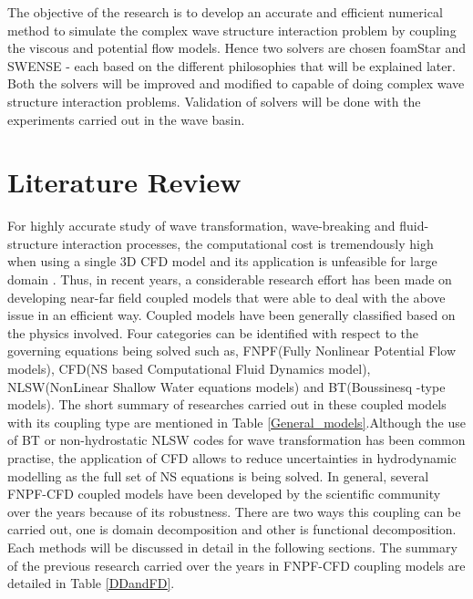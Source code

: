 \documentclass[preprint,12pt]{article}
\begin{document}
{The objective of the research is to develop an accurate and efficient numerical method to simulate the complex wave structure interaction problem by coupling the viscous and potential flow models. Hence two solvers are chosen foamStar and SWENSE - each based on the different philosophies that will be  explained later. Both the solvers will be improved and modified to capable of doing complex wave structure interaction problems. Validation of solvers will be done with the experiments carried out in the wave basin. 



\section{Literature Review}
For highly accurate study of wave transformation, wave-breaking and fluid-structure interaction processes, the computational cost is tremendously high when using a single 3D CFD model and its application is unfeasible for large domain \cite{Vandebeek2018}. Thus, in recent years, a considerable research effort has been made on developing near-far field coupled models that were able to deal with the above issue in an efficient way.  Coupled models have been generally classified based on the physics involved. Four categories can be identified with respect to the  governing equations being solved such as,  FNPF(Fully Nonlinear Potential Flow models), CFD(NS based Computational Fluid Dynamics model), NLSW(NonLinear Shallow Water equations models) and BT(Boussinesq -type models). The short summary of researches carried out in these coupled models with its coupling type are mentioned in Table \ref{General_models}.Although the use of BT or non-hydrostatic NLSW codes for wave transformation has been common practise, the application of CFD allows to reduce uncertainties in hydrodynamic modelling as the full set of NS equations is being solved.  In general, several FNPF-CFD coupled models have been developed by the scientific community over the years because of its robustness. There are two ways this coupling can be carried out, one is domain decomposition and other is functional decomposition. Each methods will be discussed in detail in the following sections. The summary of the  previous research carried over the years in FNPF-CFD coupling models are detailed in Table \ref{DDandFD}. 



}
\end{document}
